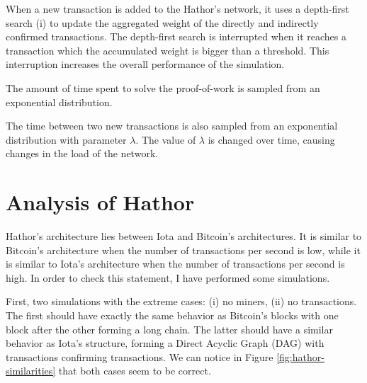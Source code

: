 When a new transaction is added to the Hathor's network, it uses a depth-first search \citep{cormen2009introduction} (i) to update the aggregated weight of the directly and indirectly confirmed transactions. The depth-first search is interrupted when it reaches a transaction which the accumulated weight is bigger than a threshold. This interruption increases the overall performance of the simulation.


The amount of time spent to solve the proof-of-work is sampled from an exponential distribution.

The time between two new transactions is also sampled from an exponential distribution with parameter $\lambda$. The value of $\lambda$ is changed over time, causing changes in the load of the network.



\chapter{Analysis of Hathor}

Hathor's architecture lies between Iota and Bitcoin's architectures. It is similar to Bitcoin's architecture when the number of transactions per second is low, while it is similar to Iota's architecture when the number of transactions per second is high. In order to check this statement, I have performed some simulations.

First, two simulations with the extreme cases: (i) no miners, (ii) no transactions. The first should have exactly the same behavior as Bitcoin's blocks with one block after the other forming a long chain. The latter should have a similar behavior as Iota's structure, forming a Direct Acyclic Graph (DAG) with transactions confirming transactions. We can notice in Figure \ref{fig:hathor-similarities} that both cases seem to be correct.

